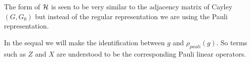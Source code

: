 \documentclass[12pt,notitlepage,longbibliography,nofootinbib,tightenlines]{revtex4}
\begin{document}
The form of $\mathcal{H}$ is seen to be very similar
to the adjacency matrix of Cayley$(G, G_0)$ but
instead of the regular representation we are
using the Pauli representation.

%
%
%
%



%
%
%

In the sequal we will make the identification
between $g$ and $\rho_{pauli}(g)$.
So terms such as $Z$ and $X$ are understood
to be the corresponding Pauli linear operators.

%
%
\end{document}
